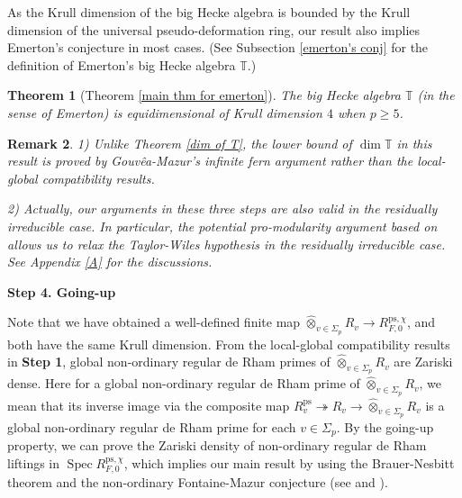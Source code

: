 \documentclass[a4paper, 12pt]{amsart}
\newtheorem{thm}{Theorem}[subsection]
\newtheorem{rem}[thm]{\bf Remark}
\DeclareMathOperator{\Spec}{Spec}
\def\ps{\mathrm{ps}}
\newcommand{\T}{\mathbb{T}}
\begin{document}
	As the Krull dimension of the big Hecke algebra is bounded by the Krull dimension of the universal pseudo-deformation ring, our result also implies Emerton's conjecture \cite[Conjecture 2.9]{Emerton2011} in most cases. (See Subsection \ref{emerton's conj} for the definition of Emerton's big Hecke algebra $\T$.)
	
	\begin{thm}[Theorem \ref{main thm for emerton}]
		The big Hecke algebra $\T$ (in the sense of Emerton) is equidimensional of Krull dimension $4$ when $p \ge 5$.
	\end{thm}
	
	\begin{rem}
		1) Unlike Theorem \ref{dim of T}, the lower bound of $\dim \T$ in this result is proved by Gouv\^ea-Mazur's infinite fern argument rather than the local-global compatibility results.
		
		2) Actually, our arguments in these three steps are also valid in the residually irreducible case. In particular, the potential pro-modularity argument based on \cite[Section 9]{pan2022fontaine} allows us to relax the Taylor-Wiles hypothesis in the residually irreducible case. See Appendix \ref{A} for the discussions.
	\end{rem}
	
	\textbf{Step 4. Going-up}
	
	Note that we have obtained a well-defined finite map $\widehat{\otimes}_{v \in \Sigma_p} R_v \to R_{F, 0}^{\ps, \chi} $, and both have the same Krull dimension. From the local-global compatibility results in \textbf{Step 1}, global non-ordinary regular de Rham primes of $\widehat{\otimes}_{v \in \Sigma_p} R_v$ are Zariski dense. Here for a global non-ordinary regular de Rham prime of $\widehat{\otimes}_{v \in \Sigma_p} R_v$, we mean that its inverse image via the composite map $R_v^\ps \twoheadrightarrow R_v \to \widehat{\otimes}_{v \in \Sigma_p} R_v $ is a global non-ordinary regular de Rham prime for each $v \in \Sigma_p $. By the going-up property, we can prove the Zariski density of non-ordinary regular de Rham liftings in $\Spec R_{F, 0}^{\ps, \chi}$, which implies our main result by using the Brauer-Nesbitt theorem and the non-ordinary Fontaine-Mazur conjecture (see \cite[Theorem 7.1.1]{pan2022fontaine} and \cite[Theorem 5.1.1]{Zhang:2024aa}).
	
\end{document}
